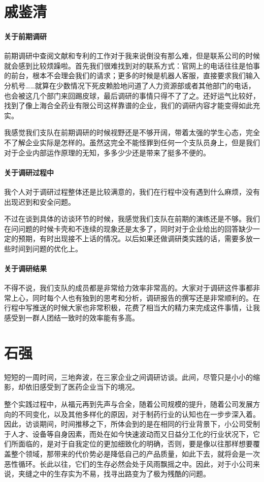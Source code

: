 \section*{戚鉴清}

\paragraph{关于前期调研}
前期调研中查阅文献和专利的工作对于我来说倒没有那么难，但是联系公司的时候就会感到比较烦躁啦。首先我们很难找到对的联系方式：官网上的电话往往是怕事的前台，根本不会理会我们的请求；更多的时候是机器人客服，直接要求我们输入分机号……就算在少数情况下死皮赖脸地问道了人力资源部或者其他部门的电话，也会被这几个部门来回踢皮球，最后调研的事情只得不了了之。还好运气比较好，找到了像上海合全药业有限公司这样靠谱的企业，我们的调研内容才能变得如此充实。

我感觉我们支队在前期调研的时候视野还是不够开阔，带着太强的学生心态，完全不了解企业实际是怎样的。虽然这完全不能怪罪到任何一个支队员身上，但是我们对于企业内部运作原理的无知，多多少少还是带来了挺多不便的。

\paragraph{关于调研过程中}
我个人对于调研过程整体还是比较满意的，我们在行程中没有遇到什么麻烦，没有出现迟到和安全问题。

不过在谈到具体的访谈环节的时候，我感觉我们支队在前期的演练还是不够。我们在问问题的时候卡壳和不连续的现象还是太多了，同时对于企业给出的回答缺少一定的预期，有时出现接不上话的情况。以后如果还做调研类实践的话，需要多放一些时间到问题的优化上。

\paragraph{关于调研结果}
不得不说，我们支队的成员都是非常给力效率非常高的。大家对于调研这件事都非常上心，同时每个人也有独到的思考和分析，调研报告的撰写还是非常顺利的。在行程中写推送的时候大家也非常积极，花费了相当大的精力来完成这件事情，让我感受到一群人团结一致时的效率能有多高。


\section*{石强}
短短的一周时间，三地奔波，在三家企业之间调研访谈。此间，尽管只是小小的缩影，却依旧感受到了医药企业当下的境况。

整个实践过程中，从福元再到先声与合全，随着公司规模的提升，随着公司发展方向的不同变化，以及其他多样化的原因，对于制药行业的认知也在一步步深入着。因此，访谈期间，时间推移之下，所体会到的是在相同的行业背景下，小公司受制于人才、设备等自身因素，而处在如今快速波动而又日益分工化的行业状况下，它们所面临的，是对于自我定位的更加细致化的明确，否则，要是像以往那样想要覆盖整个领域，那带来的代价势必是降低自己的产品质量，如此下去，就将会是一次恶性循环。长此以往，它们的生存必然会处于风雨飘摇之中。因此，对于小公司来说，夹缝之中的生存实为不易，找寻出路变为了极为残酷的问题。

